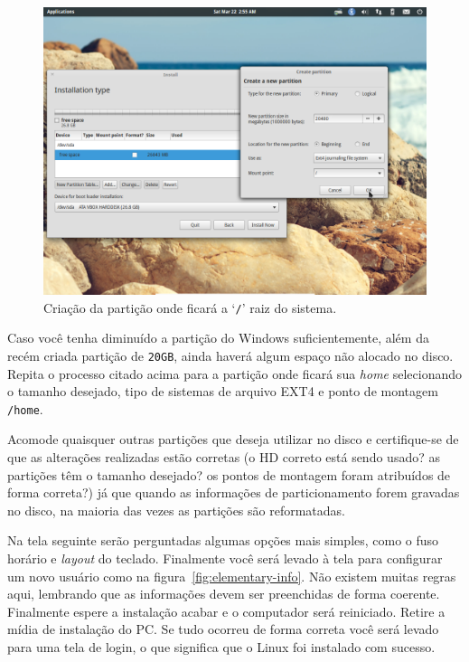 \documentclass{handout_utfpr}
\begin{document}
\begin{figure}[h]
  \centering
  \includegraphics[scale=.6]{imagens/elementary-install-05.png}
  \caption{Criação da partição onde ficará a `\texttt{/}' raiz do sistema.}
  \label{fig:elementary-root}
\end{figure}

Caso você tenha diminuído a partição do Windows suficientemente, além da recém criada partição de \texttt{20GB}, ainda haverá algum espaço não alocado no disco. Repita o processo citado acima para a partição onde ficará sua \textit{home} selecionando o tamanho desejado, tipo de sistemas de arquivo EXT4 e ponto de montagem \texttt{/home}.

Acomode quaisquer outras partições que deseja utilizar no disco e certifique-se de que as alterações realizadas estão corretas (o HD correto está sendo usado? as partições têm o tamanho desejado? os pontos de montagem foram atribuídos de forma correta?) já que quando as informações de particionamento forem gravadas no disco, na maioria das vezes as partições são reformatadas.

Na tela seguinte serão perguntadas algumas opções mais simples, como o fuso horário e \textit{layout} do teclado. Finalmente você será levado à tela para configurar um novo usuário como na figura~\ref{fig:elementary-info}. Não existem muitas regras aqui, lembrando que as informações devem ser preenchidas de forma coerente. Finalmente espere a instalação acabar e o computador será reiniciado. Retire a mídia de instalação do PC\@. Se tudo ocorreu de forma correta você será levado para uma tela de login, o que significa que o Linux foi instalado com sucesso.
\end{document}
